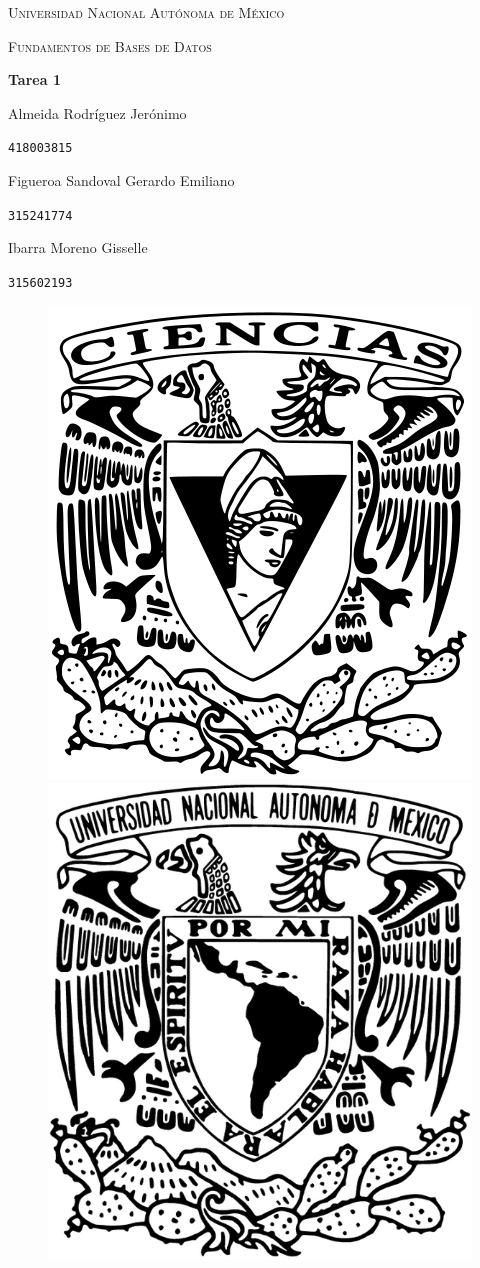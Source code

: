 \documentclass[a4paper, 12pt]{report}
\begin{document}
\begin{titlepage}
    \centering
    {\scshape\Huge Universidad Nacional Autónoma de México \par}
    \vspace{1.25cm}
    {\scshape\huge Fundamentos de Bases de Datos\par}
    \vspace{1.25cm}
    {\huge\bfseries Tarea 1\par}
    \vspace{1.25cm}
    {\Large\textsc Almeida Rodríguez Jerónimo\par}
    \vspace{.1cm}
    {\large\texttt{418003815}\par}
    \vspace{0.25cm}
    {\Large\textsc Figueroa Sandoval Gerardo Emiliano\par}
    \vspace{.1cm}
    {\large\texttt{315241774}\par}
    \vspace{0.25cm}
    {\Large\textsc Ibarra Moreno Gisselle \par}
    \vspace{.1cm}
    {\large\texttt{315602193}\par}
    \vspace{1.5cm}
    \vfill
    \begin{figure}[hb!]
        \includegraphics[width=.3\textwidth]
            {../logos/escudo_f-ciencias.png}\hfill
        \includegraphics[width=.3\textwidth]
            {../logos/Escudo_UNAM.png}\hfill
    \end{figure}
\end{titlepage}
\end{document}
